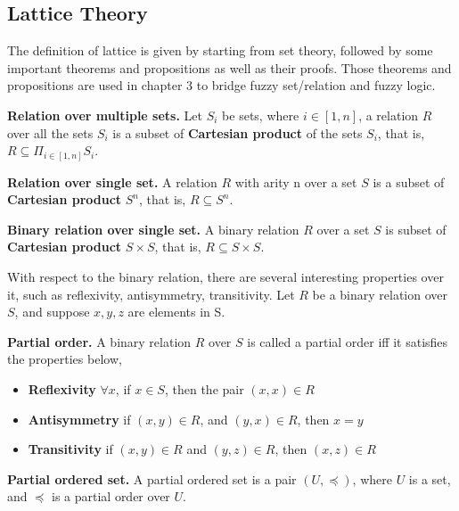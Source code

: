 \subsection{Lattice Theory}
\label{sec: LatticeTheory}
The definition of lattice is given by starting from set theory, followed by some important theorems and propositions as well as their proofs. Those theorems and propositions are used in chapter 3 to bridge fuzzy set/relation and fuzzy logic.
 
\begin{defin} \textbf{Relation over multiple sets.}
\label{def:ROverMultiSets}
Let $S_i$ be sets, where $i \in [1,n]$, a relation $R$ over all the sets $S_i$ is a subset of \textbf{Cartesian product} of the sets $S_i$, that is, $R \subseteq \Pi_{i \in [1,n]} S_i$.
\end{defin}

\begin{defin} \textbf{Relation over single set.}
\label{def:ROverSingleSet}
A relation $R$ with arity n over a set $S$ is a subset of \textbf{Cartesian product} $S^n$, that is,  $R \subseteq S^n$.
\end{defin}
 
\begin{defin} \textbf{Binary relation over single set.}
\label{def:BinROverSingleSet}
A binary relation $R$ over a set $S$ is subset of \textbf{Cartesian product} $S \times S$, that is,
$R \subseteq S \times S$. 
\end{defin}

With respect to the binary relation, there are several interesting properties over it, such as reflexivity, antisymmetry, transitivity. Let $R$ be a binary relation over $S$, and suppose $x,y,z$ are elements in S. 

\begin{defin} \textbf{Partial order.}
\label{def:PartialOrder}
A binary relation $R$ over $S$ is called a partial order iff it satisfies the properties below,
\begin{itemize}
\item \textbf{Reflexivity} $\forall x$, if $x \in S$, then the pair $(x,x) \in R$
\item \textbf{Antisymmetry} if $(x,y) \in R$, and $(y,x) \in R$, then $x=y$
\item \textbf{Transitivity} if $(x,y) \in R$ and $(y,z) \in R$, then $(x,z) \in R$
\end{itemize}
\end{defin}

\begin{defin} \textbf{Partial ordered set.}
\label{def:PartialOrderSet}
A partial ordered set is a pair $(U,\preceq)$, where $U$ is a set, and $\preceq$ is a partial order over $U$.
\end{defin}

